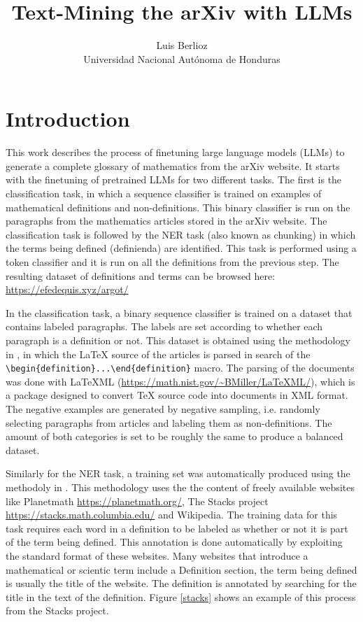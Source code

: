 \documentclass{article}
\title{Text-Mining the arXiv with LLMs}
\author{Luis Berlioz\\
    Universidad Nacional Autónoma de Honduras}
\begin{document}
\begin{abstract}
    
\end{abstract}
\section{Introduction}

This work describes the process of finetuning large language models (LLMs) to generate a complete glossary of mathematics from the arXiv website.  It starts with the finetuning of pretrained LLMs for two different tasks. The first is the classification task, in which a sequence classifier is trained on examples of mathematical definitions and non-definitions. This binary classifier is run on the paragraphs from the mathematics articles stored in the arXiv website. The classification task is followed by the NER task (also known as chunking) in which the terms being defined (definienda) are identified. This task is performed using a token classifier and it is run on all the definitions from the previous step. The resulting dataset of definitions and terms can be browsed here: \url{https://efedequis.xyz/argot/}

In the classification task, a binary sequence classifier is trained on a dataset that contains labeled paragraphs. The labels are set according to whether each paragraph is a definition or not. This dataset is obtained using the methodology in \cite{Deyan1}, in which the \LaTeX{} source of the articles is parsed in search of the \verb|\begin{definition}...\end{definition}| macro. The parsing of the documents was done with LaTeXML (\url{https://math.nist.gov/~BMiller/LaTeXML/}), which is a package designed to convert \TeX{} source code into documents in XML format. 
The negative examples are generated by negative sampling, i.e. randomly selecting paragraphs from articles and labeling them as non-definitions. The amount of both categories is set to be roughly the same to produce a balanced dataset. 

Similarly for the NER task, a training set was automatically produced using the methodoly in \cite{scss}. This methodology uses the the content of freely available websites like Planetmath \url{https://planetmath.org/}, The Stacks project \url{https://stacks.math.columbia.edu/} and Wikipedia. The training data for this task requires each word in a definition to be labeled as whether or not it is part of the term being defined. This annotation is done automatically by exploiting the standard format of these websites. Many websites that introduce a mathematical or scientic term include a Definition section, the term being defined is usually the title of the website. The definition is annotated by searching for the title in the text of the definition. Figure \ref{stacks} shows an example of this process from the Stacks project.
\end{document}
